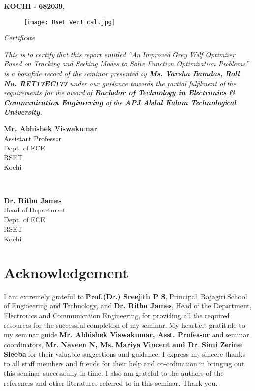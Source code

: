 \documentclass[11pt]{report}
\begin{document}
\begin{center} 
{\large \bf KOCHI - 682039, }\vspace{0.1cm}
\end{center}

\begin{figure}[hbt]
\centering
\centerline{\texttt{[image: Rset Vertical.jpg]}}
\end{figure}

\begin{center} 
{\Large \textit {Certificate}}\vspace{.1cm}
\end{center}

\justify
\doublespace
\textit {This is to certify that this report entitled ``An Improved Grey Wolf Optimizer Based on Tracking and
Seeking Modes to Solve Function Optimization Problems'' is a bonafide record of the seminar presented by \textbf{Ms. Varsha Ramdas, Roll No. RET17EC177} under our guidance towards the partial fulfilment of the requirements for the award of \textbf{Bachelor of Technology in Electronics \& Communication Engineering} of the \textbf{APJ Abdul Kalam Technological University}.}
\vspace{0.4cm}

\begin{minipage}{0.45\textwidth}
\begin{flushleft} \large
\textbf{Mr. Abhishek Viswakumar}\\
Assistant Professor\\
Dept. of ECE\\
RSET\\
Kochi
\end{flushleft}
\end{minipage}
~
\begin{minipage}{0.4\textwidth}
\begin{flushright} \large
\textbf{Dr. Rithu James}\\
Head of Department\\
Dept. of ECE\\
RSET\\
Kochi
\end{flushright}
\end{minipage}
\chapter*{Acknowledgement}
\setcounter{page}{1}
I am extremely grateful to \textbf{Prof.(Dr.) Sreejith P S}, Principal, Rajagiri School of Engineering and Technology, and \textbf{Dr. Rithu James}, Head of the Department, Electronics and Communication Engineering, for providing all the required resources for the successful completion of my seminar. My heartfelt gratitude to my seminar guide \textbf{Mr. Abhishek Viswakumar, Asst. Professor} and seminar coordinators, \textbf{Mr. Naveen N, Ms. Mariya Vincent and Dr. Simi Zerine Sleeba} for their valuable suggestions and guidance. I express my sincere thanks to all staff members and friends for their help and co-ordination in bringing out this seminar successfully in time. I also am grateful to the authors of the references and other literatures referred to in this seminar. Thank you.
\end{document}
